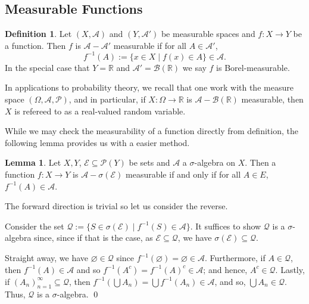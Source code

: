 \documentclass[
]{article}
\theoremstyle{definition}
\theoremstyle{definition}
\newtheorem{definition}{Definition}[section]
\newtheorem{lemma}{Lemma}[section]
\begin{document}
\hypertarget{measurable-functions}{%
\subsection{Measurable Functions}\label{measurable-functions}}

\begin{definition}
  Let \((X, \mathcal{A})\) and \((Y, \mathcal{A}')\) be measurable spaces and 
  \(f : X \to Y\) be a function. Then \(f\) is \(\mathcal{A} - \mathcal{A}'\) 
  measurable if for all \(A \in \mathcal{A}'\), 
  \[f^{-1}(A) := \{x \in X \mid f(x) \in A\} \in \mathcal{A}.\]
  In the special case that \(Y = \mathbb{R}\) and \(\mathcal{A}' = \mathcal{B}(\mathbb{R})\) 
  we say \(f\) is Borel-measurable.
\end{definition}

In applications to probability theory, we recall that one work with the
measure space \((\Omega, \mathcal{A}, \mathcal{P})\), and in particular,
if \(X : \Omega \to \mathbb{R}\) is
\(\mathcal{A} - \mathcal{B}(\mathbb{R})\) measurable, then \(X\) is
refereed to as a real-valued random variable.

While we may check the measurability of a function directly from
definition, the following lemma provides us with a easier method.

\begin{lemma}\label{measurable_gen}
  Let \(X, Y\), \(\mathcal{E} \subseteq \mathcal{P}(Y)\) be sets and 
  \(\mathcal{A}\) a \(\sigma\)-algebra on \(X\). Then a function 
  \(f : X \to Y\) is \(\mathcal{A} - \sigma(\mathcal{E})\) measurable 
  if and only if for all \(A \in E\), \(f^{-1}(A) \in \mathcal{A}\).
\end{lemma}
\proof

The forward direction is trivial so let us consider the reverse.

Consider the set
\(\mathcal{Q} := \{ S \in \sigma(\mathcal{E}) \mid f^{-1}(S) \in \mathcal{A}\}\).
It suffices to show \(\mathcal{Q}\) is a \(\sigma\)-algebra since, since
if that is the case, as \(\mathcal{E} \subseteq \mathcal{Q}\), we have
\(\sigma(\mathcal{E}) \subseteq \mathcal{Q}\).

Straight away, we have \(\varnothing \in \mathcal{Q}\) since
\(f^{-1}(\varnothing) = \varnothing \in \mathcal{A}\). Furthermore, if
\(A \in \mathcal{Q}\), then \(f^{-1}(A) \in \mathcal{A}\) and so
\(f^{-1}(A^c) = f^{-1}(A)^c \in \mathcal{A}\); and hence,
\(A^c \in \mathcal{Q}\). Lastly, if
\((A_n)_{n = 1}^\infty \subseteq \mathcal{Q}\), then
\(f^{-1}\left(\bigcup A_n \right) = \bigcup f^{-1}(A_n) \in \mathcal{A}\),
and so, \(\bigcup A_n \in \mathcal{Q}\). Thus, \(\mathcal{Q}\) is a
\(\sigma\)-algebra. \qed
\end{document}
